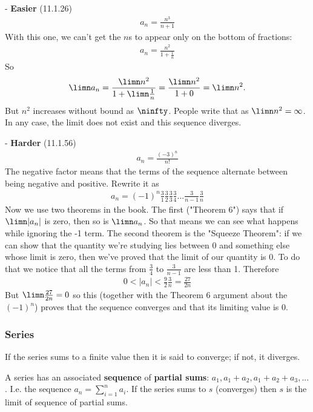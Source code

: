 - \textbf{Easier} (11.1.26)
\begin{align*}
  a_n = \frac{n^3}{n + 1}
\end{align*}
With this one, we can't get the $n$s to appear only on the bottom of fractions:
\begin{align*}
  a_n = \frac{n^2}{1 + \frac{1}{n}}
\end{align*}
So
\begin{align*}
  \limn a_n = \frac{\limn n^2}{1 + \limn\frac{1}{n}} = \frac{\limn n^2}{1 + 0} = \limn n^2.
\end{align*}
But $n^2$ increases without bound as $\ninfty$. People write that as $\limn n^2 = \infty$. In any case, the limit does not exist and this sequence diverges.

- \textbf{Harder} (11.1.56)
\begin{align*}
  a_n = \frac{(-3)^n}{n!}
\end{align*}
The negative factor means that the terms of the sequence alternate between being negative and positive. Rewrite it as
\begin{align*}
  a_n = (-1)^n\frac{3}{1}\frac{3}{2}\frac{3}{3}\frac{3}{4}...\frac{3}{n-1}\frac{3}{n}
\end{align*}
Now we use two theorems in the book. The first ("Theorem 6") says that if $\limn |a_n|$ is zero, then so is $\limn a_n$. So that means we can see what happens while ignoring the -1 term. The second theorem is the "Squeeze Theorem": if we can show that the quantity we're studying lies between 0 and something else whose limit is zero, then we've proved that the limit of our quantity is 0. To do that we notice that all the terms from $\frac{3}{4}$ to $\frac{3}{n-1}$ are less than 1. Therefore
\begin{align*}
  0 < |a_n| < \frac{9}{2}\frac{3}{n} = \frac{27}{2n}
\end{align*}
But $\limn \frac{27}{2n} = 0$ so this (together with the Theorem 6 argument about the $(-1)^n$) proves that the sequence converges and that its limiting value is 0.

\subsubsection{Series}

If the series sums to a finite value then it is said to converge; if not, it diverges.

A series has an associated \textbf{sequence} of \textbf{partial sums}: $a_1, a_1 + a_2, a_1 + a_2 + a_3, ...$. I.e. the sequence $a_n = \sum_{i=1}^n a_i$. If the series sums to $s$ (converges) then $s$ is the limit of sequence of partial sums.

